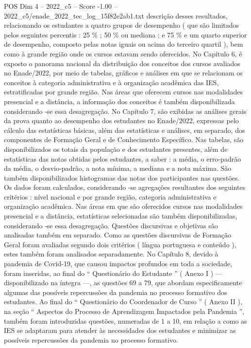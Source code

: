 \begin{textsample}{POS Dim 4 – 2022\_c5 – Score -1.00 – 2022\_c5/enade\_2022\_tec\_log\_15f82e2ab1.txt}  \label{ex:f4_pos_282}
descrição desses resultados, relacionando os estudantes a quatro grupos de desempenho ( que são limitados pelos seguintes percentis : 25 \% ; 50 \% ou mediana ; e 75 \% e um quarto superior de desempenho, composto pelas notas iguais ou acima do terceiro quartil ), bem como à grande região onde os cursos estavam sendo oferecidos.
No Capítulo 6, é exposto o panorama nacional da distribuição dos conceitos dos cursos avaliados no Enade/2022, por meio de tabelas, gráficos e análises em que se relacionam os conceitos à categoria administrativa e à organização acadêmica das IES, estratificadas por grande região.
Nas áreas que oferecem cursos nas modalidades presencial e a distância, a informação dos conceitos é também disponibilizada considerando -se essa desagregação.
No Capítulo 7, são exibidas as análises gerais da prova quanto ao desempenho dos estudantes no Enade/2022, expressas pelo cálculo das estatísticas básicas, além das estatísticas e análises, em separado, dos componentes de Formação Geral e de Conhecimento Específico.
Nas tabelas, são disponibilizados os totais da população e dos estudantes presentes, além de estatísticas das notas obtidas pelos estudantes, a saber : a média, o erro-padrão da média, o desvio-padrão, a nota mínima, a mediana e a nota máxima.
São também disponibilizados histogramas das notas dos participantes nas questões.
Os dados foram calculados, considerando -se agregações resultantes dos seguintes critérios : nível nacional e por grande região, categoria administrativa e organização acadêmica.
Nas áreas em que são oferecidos cursos nas modalidades presencial e a distância, estatísticas selecionadas são também disponibilizadas, considerando -se essa desagregação.
Questões discursivas e objetivas são analisadas também em separado.
Como as questões discursivas de Formação Geral foram avaliadas segundo dois critérios ( língua portuguesa e conteúdo ), estes também foram analisados separadamente.
No Capítulo 8, devido à pandemia de Covid-19, que causou impactos profundos em toda a sociedade, foram inseridas, ao final do “ Questionário do Estudante ” ( Anexo I ) — disponibilizado na íntegra —, as questões 69 a 79, que abordam especificamente algumas das possíveis repercussões da pandemia no processo formativo dos estudantes.
Ao final do “ Questionário do Coordenador de Curso ” ( Anexo II ), na seção “ Aspectos do Processo de Aprendizagem Impactados pela Pandemia ”, também foram introduzidas questões, numeradas de 1 a 10, em relação a como as IES se adaptaram para atender às necessidades dos estudantes e minimizar as possíveis repercussões da pandemia no processo formativo.

\end{textsample}
